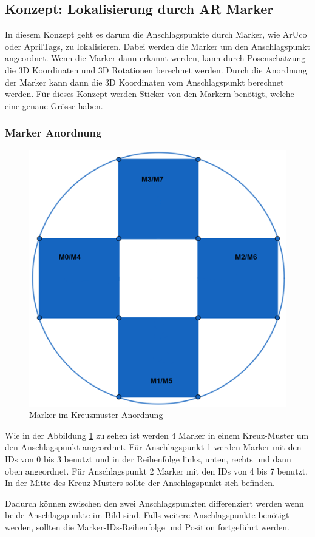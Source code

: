 \subsection{Konzept: Lokalisierung durch AR Marker}

In diesem Konzept geht es darum die Anschlagspunkte durch Marker, wie ArUco oder AprilTags, zu lokalisieren. Dabei werden die Marker um den Anschlagspunkt angeordnet. Wenn die Marker dann erkannt werden, kann durch Posenschätzung die 3D Koordinaten und 3D Rotationen berechnet werden. Durch die Anordnung der Marker kann dann die 3D Koordinaten vom Anschlagspunkt berechnet werden. 
Für dieses Konzept werden Sticker von den Markern benötigt, welche eine genaue Grösse haben. 

\subsubsection{Marker Anordnung}

\begin{figure}[H]
    \centering
    \includegraphics[width=0.5\linewidth]{graphics/anordnung_marker.png}
    \caption{Marker im Kreuzmuster Anordnung}
    \label{fig:markerAnordnung}
\end{figure}

Wie in der Abbildung \ref{fig:markerAnordnung} zu sehen ist werden 4 Marker in einem Kreuz-Muster um den Anschlagspunkt angeordnet. 
Für Anschlagspunkt 1 werden Marker mit den IDs von 0 bis 3 benutzt und in der Reihenfolge links, unten, rechts und dann oben angeordnet. 
Für Anschlagspunkt 2 Marker mit den IDs von 4 bis 7 benutzt. 
In der Mitte des Kreuz-Musters sollte der Anschlagspunkt sich befinden. 

Dadurch können zwischen den zwei Anschlagspunkten differenziert werden wenn beide Anschlagspunkte im Bild sind. 
Falls weitere Anschlagspunkte benötigt werden, sollten die Marker-IDs-Reihenfolge und Position fortgeführt werden. 

